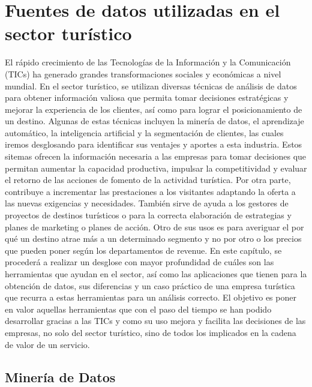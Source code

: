 \documentclass[
  letterpaper,
  DIV=11,
  numbers=noendperiod]{scrreprt}
\begin{document}
\hypertarget{fuentes-de-datos-utilizadas-en-el-sector-turuxedstico}{%
\section{Fuentes de datos utilizadas en el sector
turístico}\label{fuentes-de-datos-utilizadas-en-el-sector-turuxedstico}}

El rápido crecimiento de las Tecnologías de la Información y la
Comunicación (TICs) ha generado grandes transformaciones sociales y
económicas a nivel mundial. En el sector turístico, se utilizan diversas
técnicas de análisis de datos para obtener información valiosa que
permita tomar decisiones estratégicas y mejorar la experiencia de los
clientes, así como para lograr el posicionamiento de un destino. Algunas
de estas técnicas incluyen la minería de datos, el aprendizaje
automático, la inteligencia artificial y la segmentación de clientes,
las cuales iremos desglosando para identificar sus ventajes y aportes a
esta industria. Estos sitemas ofrecen la información necesaria a las
empresas para tomar decisiones que permitan aumentar la capacidad
productiva, impulsar la competitividad y evaluar el retorno de las
acciones de fomento de la actividad turística. Por otra parte,
contribuye a incrementar las prestaciones a los visitantes adaptando la
oferta a las nuevas exigencias y necesidades. También sirve de ayuda a
los gestores de proyectos de destinos turísticos o para la correcta
elaboración de estrategias y planes de marketing o planes de acción.
Otro de sus usos es para averiguar el por qué un destino atrae más a un
determinado segmento y no por otro o los precios que pueden poner según
los departamentos de revenue. En este capítulo, se procederá a realizar
un desglose con mayor profundidad de cuáles son las herramientas que
ayudan en el sector, así como las aplicaciones que tienen para la
obtención de datos, sus diferencias y un caso práctico de una empresa
turística que recurra a estas herramientas para un análisis correcto. El
objetivo es poner en valor aquellas herramientas que con el paso del
tiempo se han podido desarrollar gracias a las TICs y como su uso mejora
y facilita las decisiones de las empresas, no solo del sector turístico,
sino de todos los implicados en la cadena de valor de un servicio.

\hypertarget{mineruxeda-de-datos}{%
\subsection{Minería de Datos}\label{mineruxeda-de-datos}}
\end{document}
